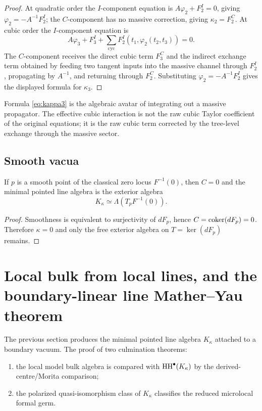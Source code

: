 \begin{proof}
At quadratic order the \(I\)-component equation is
\(A\varphi_2+F_2^I=0\), giving
\(\varphi_2=-A^{-1}F_2^I\); the \(C\)-component has no massive
correction, giving \(\kappa_2=F_2^C\).  At cubic order the
\(I\)-component equation is
\[
A\varphi_3+F_3^I
+\sum_{\mathrm{cyc}}F_2^I(t_1,\varphi_2(t_2,t_3))=0.
\]
The \(C\)-component receives the direct cubic term \(F_3^C\) and the
indirect exchange term obtained by feeding two tangent inputs into the
massive channel through \(F_2^I\), propagating by \(A^{-1}\), and
returning through \(F_2^C\).  Substituting
\(\varphi_2=-A^{-1}F_2^I\) gives the displayed formula for \(\kappa_3\).
\end{proof}

\begin{remark}
Formula \eqref{eq:kappa3} is the algebraic avatar of integrating out a massive propagator. The effective cubic interaction is not the raw cubic Taylor coefficient of the original equations; it is the raw cubic term corrected by the tree-level exchange through the massive sector.
\end{remark}

\subsection{Smooth vacua}

\begin{corollary}%
If $p$ is a smooth point of the classical zero locus $F^{-1}(0)$, then $C=0$ and the minimal pointed line algebra is the exterior algebra
\[
K_\kappa\simeq \Lambda(T_pF^{-1}(0)).
\]
\end{corollary}

\begin{proof}
Smoothness is equivalent to surjectivity of $dF_p$, hence $C=\operatorname{coker}(dF_p)=0$. Therefore $\kappa=0$ and only the free exterior algebra on $T=\ker(dF_p)$ remains.
\end{proof}


\section{Local bulk from local lines, and the boundary-linear line Mather--Yau theorem}%

The previous section produces the minimal pointed line algebra $K_\kappa$ attached to a boundary vacuum. The proof of two culmination theorems:
\begin{enumerate}[label=(\arabic*),leftmargin=1.8em]
\item the local model bulk algebra is compared with
 \(\operatorname{HH}^\bullet(K_\kappa)\) by the derived-centre/Morita comparison;
\item the polarized quasi-isomorphism class of $K_\kappa$ classifies the reduced microlocal formal germ.
\end{enumerate}

